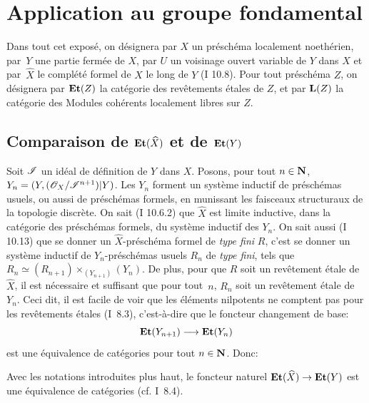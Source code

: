 \chapter{Application au groupe fondamental} \label{X}

\renewcommand{\theequation}{\arabic{equation}}

Dans tout cet expos\'e, on d\'esignera par $X$ un pr\'esch\'ema localement noeth\'erien, par~$Y$ une partie ferm\'ee de $X$, par $U$ un voisinage ouvert variable de $Y$ dans $X$ et par~$\hat{X}$ le compl\'et\'e formel de $X$ le long de $Y$ (\EGA I 10.8). Pour tout pr\'esch\'ema $Z$, on d\'esignera par $\mathbf{Et}(Z)$ la cat\'egorie des rev\^etements \'etales de $Z$, et par $\mathbf{L}(Z)$\label{pX.1} la cat\'egorie des Modules coh\'erents localement libres sur $Z$.

\enlargethispage{3mm}%
\section{Comparaison de $\mathbf{Et}(\widehat{X})$ et de $\mathbf{Et}(Y)$} \label{X.1}

Soit ${\mathscr I}$ un id\'eal de d\'efinition de $Y$ dans $X$. Posons, pour tout $n\in\mathbf{N}$, $Y_n=(Y, (\mathscr{O}_X/{\mathscr I}^{n+1}){|Y})$. Les $Y_n$ forment un syst\`eme inductif de pr\'esch\'emas usuels, ou aussi de pr\'esch\'emas formels, en munissant les faisceaux structuraux de la topologie discr\`ete. On sait (\EGA I 10.6.2) que $\hat{X}$ est limite inductive, dans la cat\'egorie des pr\'esch\'emas formels, du syst\`eme inductif des $Y_n$. On sait aussi (\EGA I 10.13) que se donner un $\hat{X}$-pr\'esch\'ema formel de \emph{type fini} $R$, c'est se donner un syst\`eme inductif de $Y_n$-pr\'esch\'emas usuels $R_n$ de \emph{type fini}, tels que $R_n\simeq(R_{n+1})\times_{(Y_{n+1})}(Y_n)$. De plus, pour que $R$ soit un rev\^etement \'etale de $\hat{X}$, il est n\'ecessaire et suffisant que pour tout~$n$, $R_n$ soit un rev\^etement \'etale de $Y_n$. Ceci dit, il est facile de voir que les \'el\'ements nilpotents ne comptent pas pour les rev\^etements \'etales (\SGA I~8.3), c'est-\`a-dire que le foncteur changement de base:
\[
\Et(Y_{n+1}) \to \Et(Y_n)
\]
est une \'equivalence de cat\'egories pour tout $n\in\mathbf{N}$. Donc:

\begin{proposition} \label{X.1.1}
Avec les notations introduites plus haut, le foncteur naturel $\Et(\hat{X})\to\Et(Y)$ est une \'equivalence de cat\'egories (cf. \textup{\SGA I~8.4}).
\end{proposition}

